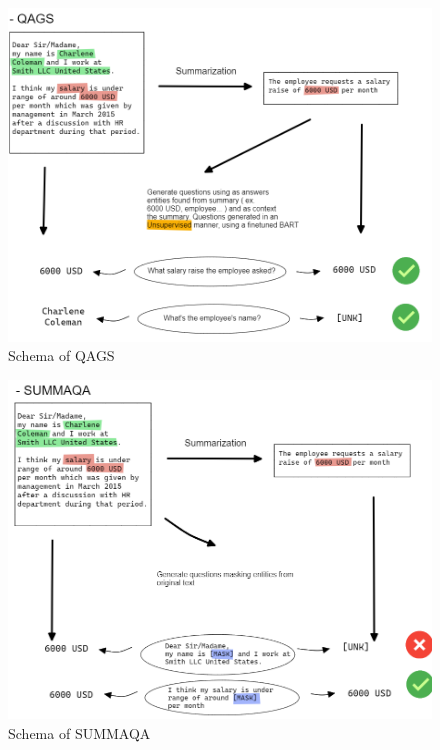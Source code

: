 \begin{figure}[h] 
    \includegraphics[width=\textwidth]{images/qa_models_qags.png}
    \caption{Schema of QAGS}
    \label{fig:schema_qags}
\end{figure}    

\begin{figure}[h] 
    \includegraphics[width=\textwidth]{images/qa_models_summaqa.png}
    \caption{Schema of SUMMAQA}
    \label{fig:schema_summa_qa}
\end{figure}    

